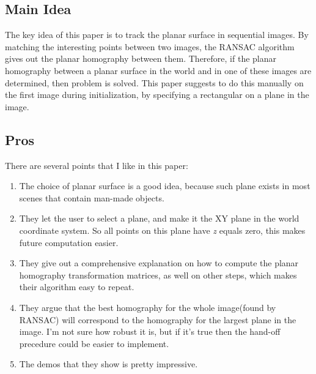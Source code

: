\documentclass[10pt,twocolumn,letterpaper]{article}
\begin{document}
\subsection{Main Idea}
The key idea of this paper is to track the planar surface in sequential images. 
By matching the interesting points between two images, the RANSAC algorithm gives out 
the planar homography between them. Therefore, if the planar homography between a planar 
surface in the world and in one of these images are determined, then problem is solved. 
This paper suggests to do this manually on the first image during initialization, 
by specifying a rectangular on a plane in the image.
\subsection{Pros}
There are several points that I like in this paper:
\begin{enumerate}

\item The choice of planar surface is a good idea, because such plane exists 
in most scenes that contain man-made objects.

\item They let the user to select a plane, and make it 
the XY plane in the world coordinate system. So all points on this plane have
{\em z} equals zero, this makes future computation easier.

\item They give out a comprehensive explanation on how to compute the 
planar homography transformation matrices, as well on other steps, 
which makes their algorithm easy to repeat.

\item They argue that the best homography for the whole image(found by RANSAC) 
will correspond to the homography for the largest plane in the image. 
I'm not sure how robust it is, but if it's true then the hand-off precedure 
could be easier to implement.

\item The demos that they show is pretty impressive.

\end{enumerate}
\end{document}
